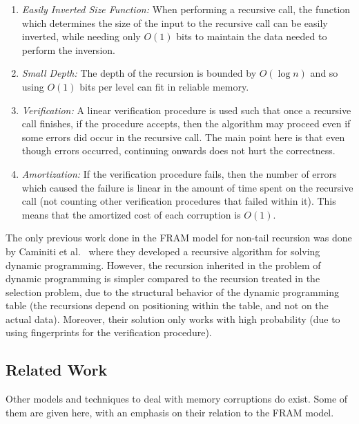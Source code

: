 \documentclass{llncs}
\begin{document}
\begin{enumerate} 

\item \emph{Easily Inverted Size Function:} When performing a recursive call, the function which determines the size of the input to the recursive call can be easily inverted, while needing only $O(1)$ bits to maintain the data needed to perform the inversion.

\item \emph{Small Depth:} The depth of the recursion is bounded by $O(\log n)$ and so using $O(1)$ bits per level can fit in reliable memory.

\item \emph{Verification:} A linear verification procedure is used such that once a recursive call finishes, if the procedure accepts, then the algorithm may proceed even if some errors did occur in the recursive call. The main point here is that even though errors occurred, continuing onwards does not hurt the correctness.

\item \emph{Amortization:} If the verification procedure fails, then the number of errors which caused the failure is linear in the amount of time spent on the recursive call (not counting other verification procedures that failed within it). This means that the amortized cost of each corruption is $O(1)$.

\end{enumerate}

The only previous work done in the FRAM model for non-tail recursion was done by Caminiti et al.~\cite{dynamic_programming} where they developed a recursive algorithm for solving dynamic programming. However, the recursion inherited in the problem of dynamic programming is simpler compared to the recursion treated in the selection problem, due to the structural behavior of the dynamic programming table (the recursions depend on positioning within the table, and not on the actual data). Moreover, their solution only works with high probability (due to using fingerprints for the verification procedure).





\subsection{Related Work}

Other models and techniques to deal with memory corruptions do exist.
Some of them are given here, with an emphasis on their relation to the FRAM model.
\end{document}
